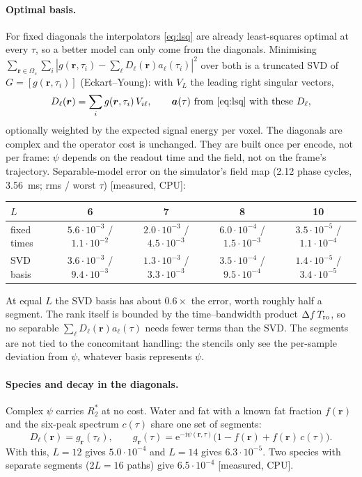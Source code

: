\documentclass[11pt]{article}
\theoremstyle{remark}
\newcommand{\rr}{\bm r}
\newcommand{\ii}{\mathrm i}
\newcommand{\ee}{\mathrm e}
\begin{document}
\paragraph{Optimal basis.} For fixed diagonals the interpolators \cref{eq:lsq} are already least-squares optimal at every $\tau$, so a better model can only come from the diagonals. Minimising $\sum_{\rr\in\Omega_s}\sum_i|g(\rr,\tau_i)-\sum_\ell D_\ell(\rr)a_\ell(\tau_i)|^2$ over both is a truncated SVD of $G=[g(\rr,\tau_i)]$ (Eckart--Young): with $V_L$ the leading right singular vectors,
\begin{equation}
  D_\ell(\rr)=\sum_ig(\rr,\tau_i)\,V_{i\ell},\qquad \bm a(\tau)\ \text{from \cref{eq:lsq} with these }D_\ell,
\end{equation}
optionally weighted by the expected signal energy per voxel. The diagonals are complex and the operator cost is unchanged. They are built once per encode, not per frame: $\psi$ depends on the readout time and the field, not on the frame's trajectory.
Separable-model error on the simulator's field map (2.12 phase cycles, 3.56~ms; rms / worst $\tau$) [measured, CPU]:
\begin{center}
\begin{tabular}{lcccc}
\toprule
$L$ & 6 & 7 & 8 & 10\\
\midrule
fixed times & $5.6\cdot10^{-3}$ / $1.1\cdot10^{-2}$ & $2.0\cdot10^{-3}$ / $4.5\cdot10^{-3}$ & $6.0\cdot10^{-4}$ / $1.5\cdot10^{-3}$ & $3.5\cdot10^{-5}$ / $1.1\cdot10^{-4}$\\
SVD basis & $3.6\cdot10^{-3}$ / $9.4\cdot10^{-3}$ & $1.3\cdot10^{-3}$ / $3.3\cdot10^{-3}$ & $3.5\cdot10^{-4}$ / $9.5\cdot10^{-4}$ & $1.4\cdot10^{-5}$ / $3.4\cdot10^{-5}$\\
\bottomrule
\end{tabular}
\end{center}
At equal $L$ the SVD basis has about $0.6\times$ the error, worth roughly half a segment. The rank itself is bounded by the time--bandwidth product $\Delta f\,T_{\rm ro}$, so no separable $\sum_\ell D_\ell(\rr)a_\ell(\tau)$ needs fewer terms than the SVD. The segments are not tied to the concomitant handling: the stencils only see the per-sample deviation from $\psi$, whatever basis represents $\psi$.

\paragraph{Species and decay in the diagonals.} Complex $\psi$ carries $R_2^*$ at no cost. Water and fat with a known fat fraction $f(\rr)$ and the six-peak spectrum $c(\tau)$ share one set of segments:
\begin{equation}
  D_\ell(\rr)=g_{\rr}(\tau_\ell),\qquad g_{\rr}(\tau)=\ee^{-\ii\psi(\rr,\tau)}\bigl(1-f(\rr)+f(\rr)\,c(\tau)\bigr).
\end{equation}
With this, $L=12$ gives $5.0\cdot10^{-4}$ and $L=14$ gives $6.3\cdot10^{-5}$. Two species with separate segments ($2L=16$ paths) give $6.5\cdot10^{-4}$ [measured, CPU].
\end{document}
